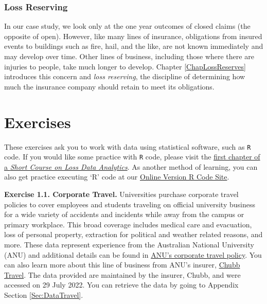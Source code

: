 \documentclass[
]{book}
\begin{document}
\hypertarget{loss-reserving}{%
\subsubsection*{Loss Reserving}\label{loss-reserving}}

In our case study, we look only at the one year outcomes of closed
claims (the opposite of open). However, like many lines of insurance,
obligations from insured events to buildings such as fire, hail, and the
like, are not known immediately and may develop over time. Other lines
of business, including those where there are injuries to people, take
much longer to develop. Chapter \ref{ChapLossReserves} introduces this concern and \emph{loss reserving}, the discipline of determining how much the insurance company should retain to meet its obligations.

\hypertarget{exercises}{%
\section{Exercises}\label{exercises}}

These exercises ask you to work with data using statistical software, such as \texttt{R} code. If you would like some practice with \texttt{R} code, please visit the \href{https://openacttexts.github.io/LDACourse1/introduction-to-loss-data-analytics.html}{first chapter of a \emph{Short Course on Loss Data Analytics}}. As another method of learning, you can also get practice executing `R' code at our \href{https://openacttexts.github.io/LDARcode/}{Online Version R Code Site}.

\textbf{Exercise 1.1. Corporate Travel.} Universities purchase corporate travel policies to cover employees and students traveling on official university business for a wide variety of accidents and incidents while away from the campus or primary workplace. This broad coverage includes medical care and evacuation, loss of personal property, extraction for political and weather related reasons, and more. These data represent experience from the Australian National University (ANU) and additional details can be found in \href{https://services.anu.edu.au/files/document-collection/TRAVEL\%20INFORMATION\%20-\%20Travel\%20Information\%20Kit_July\%202018.pdf}{ANU's corporate travel policy}. You can also learn more about this line of business from ANU's insurer, \href{https://www.chubb.com/au-en/business/business-travel-group-travel-insurance.html}{Chubb Travel}. The data provided are maintained by the insurer, Chubb, and were accessed on 29 July 2022. You can retrieve the data by going to Appendix Section \ref{Sec:DataTravel}.
\end{document}
